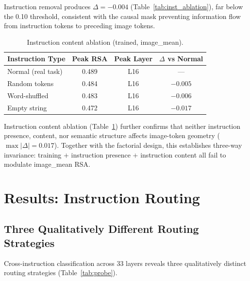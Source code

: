 \documentclass[10pt,twocolumn]{article}
\begin{document}
Instruction removal produces $\Delta = -0.004$ (Table~\ref{tab:inst_ablation}), far below the 0.10 threshold, consistent with the causal mask preventing information flow from instruction tokens to preceding image tokens.

\begin{table}[t]
\centering
\caption{Instruction content ablation (trained, image\_mean).}
\label{tab:inst_content}
\small
\begin{tabular}{lccc}
\toprule
Instruction Type & Peak RSA & Peak Layer & $\Delta$ vs Normal \\
\midrule
Normal (real task) & 0.489 & L16 & --- \\
Random tokens & 0.484 & L16 & $-0.005$ \\
Word-shuffled & 0.483 & L16 & $-0.006$ \\
Empty string & 0.472 & L16 & $-0.017$ \\
\bottomrule
\end{tabular}
\end{table}

Instruction content ablation (Table~\ref{tab:inst_content}) further confirms that neither instruction presence, content, nor semantic structure affects image-token geometry ($\max |\Delta| = 0.017$).
Together with the factorial design, this establishes three-way invariance: training $+$ instruction presence $+$ instruction content all fail to modulate image\_mean RSA.

\section{Results: Instruction Routing}
\label{sec:routing}

\subsection{Three Qualitatively Different Routing Strategies}
\label{sec:probe}

Cross-instruction classification across 33 layers reveals three qualitatively distinct routing strategies (Table~\ref{tab:probe}).
\end{document}
